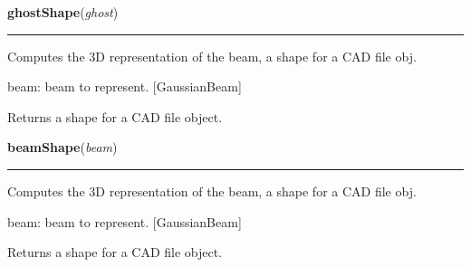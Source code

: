     \vspace{0.5ex}

\hspace{.8\funcindent}\begin{boxedminipage}{\funcwidth}

    \raggedright \textbf{ghostShape}(\textit{ghost})

    \vspace{-1.5ex}

    \rule{\textwidth}{0.5\fboxrule}
\setlength{\parskip}{2ex}
    Computes the 3D representation of the beam, a shape for a CAD file obj.

    beam: beam to represent. [GaussianBeam]

    Returns a shape for a CAD file object.

\setlength{\parskip}{1ex}
    \end{boxedminipage}

    \label{theia:rendering:shapes:beamShape}

    \vspace{0.5ex}

\hspace{.8\funcindent}\begin{boxedminipage}{\funcwidth}

    \raggedright \textbf{beamShape}(\textit{beam})

    \vspace{-1.5ex}

    \rule{\textwidth}{0.5\fboxrule}
\setlength{\parskip}{2ex}
    Computes the 3D representation of the beam, a shape for a CAD file obj.

    beam: beam to represent. [GaussianBeam]

    Returns a shape for a CAD file object.

\setlength{\parskip}{1ex}
    \end{boxedminipage}

